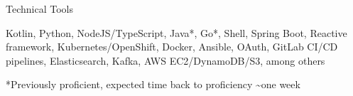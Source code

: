 


\begin{cvskills}


\cvskill
{Technical Tools} %
{
    \begin{cvitems}
        \item[] {Kotlin, Python, NodeJS/TypeScript, Java*, Go*, Shell, Spring Boot, Reactive framework, Kubernetes/OpenShift, Docker, Ansible, OAuth, GitLab CI/CD pipelines, Elasticsearch, Kafka, AWS EC2/DynamoDB/S3, among others}
        \item[] {\scriptsize{*Previously proficient, expected time back to proficiency \textasciitilde{one} week}}
    \end{cvitems}
}









\end{cvskills}
